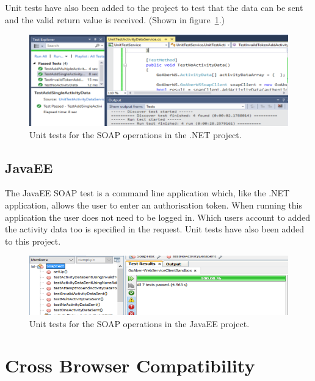 Unit tests have also been added to the project to test that the data can be sent and the valid return value is received. (Shown in figure~\ref{fig:testing_SoapUnitTestsNET}.)

\begin{figure}[H]
\begin{center}
\includegraphics[scale=0.3]{images/testing/SoapUnitTestsNET.png} 
\caption{Unit tests for the SOAP operations in the .NET project.}
\label{fig:testing_SoapUnitTestsNET}
\end{center}
\end{figure}


\subsection{JavaEE}

The JavaEE SOAP test is a command line application which, like the .NET application, allows the user to enter an authorisation token. When running this application the user does not need to be logged in. Which users account to added the activity data too is specified in the request. Unit tests have also been added to this project.

\begin{figure}[H]
\begin{center}
\includegraphics[scale=0.3]{images/testing/SoapUnitTestsJavaEE.png} 
\caption{Unit tests for the SOAP operations in the JavaEE project.}
\label{fig:testing_SoapUnitTestsJavaEE}
\end{center}
\end{figure}


\section{Cross Browser Compatibility}

